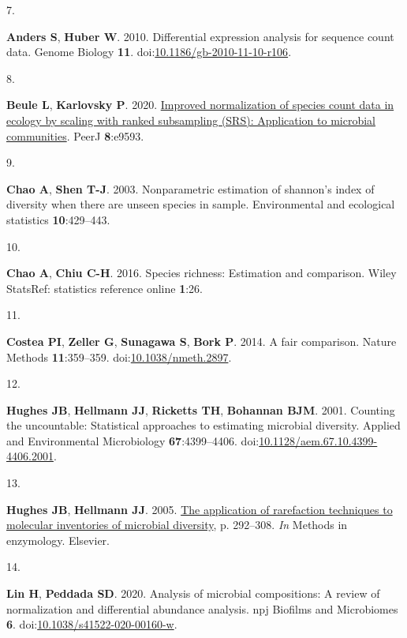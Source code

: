 \documentclass[
]{article}
\newlength{\cslhangindent}
\newlength{\csllabelwidth}
\newlength{\cslentryspacingunit} %
\newenvironment{CSLReferences}[2] %
 {%
  \setlength{\parindent}{0pt}
  \ifodd #1
  \let\oldpar\par
  \def\par{\hangindent=\cslhangindent\oldpar}
  \fi
  \setlength{\parskip}{#2\cslentryspacingunit}
 }%
 {}
\newcommand{\CSLLeftMargin}[1]{\parbox[t]{\csllabelwidth}{#1}}
\newcommand{\CSLRightInline}[1]{\parbox[t]{\linewidth - \csllabelwidth}{#1}\break}
\begin{document}
\begin{CSLReferences}{0}{1}
\leavevmode{}%
\CSLLeftMargin{7. }%
\CSLRightInline{\textbf{Anders S}, \textbf{Huber W}. 2010. Differential
expression analysis for sequence count data. Genome Biology \textbf{11}.
doi:\href{https://doi.org/10.1186/gb-2010-11-10-r106}{10.1186/gb-2010-11-10-r106}.}

\leavevmode{}%
\CSLLeftMargin{8. }%
\CSLRightInline{\textbf{Beule L}, \textbf{Karlovsky P}. 2020.
\href{https://doi.org/10.7717/peerj.9593}{Improved normalization of
species count data in ecology by scaling with ranked subsampling (SRS):
Application to microbial communities}. PeerJ \textbf{8}:e9593.}

\leavevmode{}%
\CSLLeftMargin{9. }%
\CSLRightInline{\textbf{Chao A}, \textbf{Shen T-J}. 2003. Nonparametric
estimation of shannon's index of diversity when there are unseen species
in sample. Environmental and ecological statistics
\textbf{10}:429--443.}

\leavevmode{}%
\CSLLeftMargin{10. }%
\CSLRightInline{\textbf{Chao A}, \textbf{Chiu C-H}. 2016. Species
richness: Estimation and comparison. Wiley StatsRef: statistics
reference online \textbf{1}:26.}

\leavevmode{}%
\CSLLeftMargin{11. }%
\CSLRightInline{\textbf{Costea PI}, \textbf{Zeller G}, \textbf{Sunagawa
S}, \textbf{Bork P}. 2014. A fair comparison. Nature Methods
\textbf{11}:359--359.
doi:\href{https://doi.org/10.1038/nmeth.2897}{10.1038/nmeth.2897}.}

\leavevmode{}%
\CSLLeftMargin{12. }%
\CSLRightInline{\textbf{Hughes JB}, \textbf{Hellmann JJ},
\textbf{Ricketts TH}, \textbf{Bohannan BJM}. 2001. Counting the
uncountable: Statistical approaches to estimating microbial diversity.
Applied and Environmental Microbiology \textbf{67}:4399--4406.
doi:\href{https://doi.org/10.1128/aem.67.10.4399-4406.2001}{10.1128/aem.67.10.4399-4406.2001}.}

\leavevmode{}%
\CSLLeftMargin{13. }%
\CSLRightInline{\textbf{Hughes JB}, \textbf{Hellmann JJ}. 2005.
\href{https://doi.org/10.1016/s0076-6879(05)97017-1}{The application of
rarefaction techniques to molecular inventories of microbial diversity},
p. 292--308. \emph{In} Methods in enzymology. Elsevier.}

\leavevmode{}%
\CSLLeftMargin{14. }%
\CSLRightInline{\textbf{Lin H}, \textbf{Peddada SD}. 2020. Analysis of
microbial compositions: A review of normalization and differential
abundance analysis. npj Biofilms and Microbiomes \textbf{6}.
doi:\href{https://doi.org/10.1038/s41522-020-00160-w}{10.1038/s41522-020-00160-w}.}


\end{CSLReferences}
\end{document}

